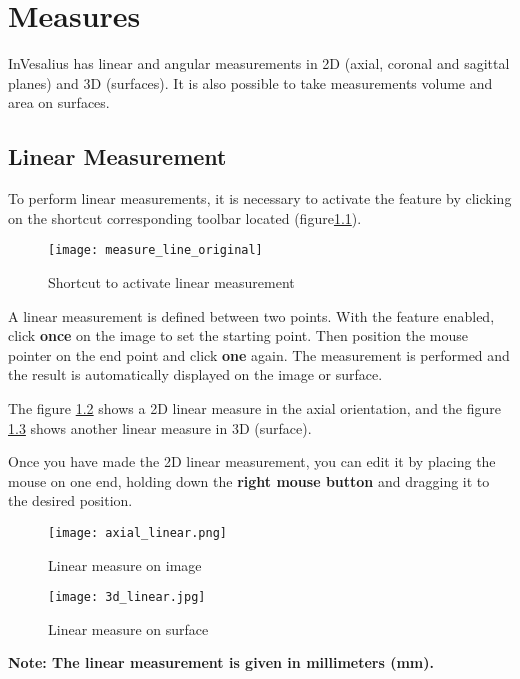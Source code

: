 \chapter{Measures}

InVesalius has linear and angular measurements in 2D (axial, coronal and sagittal planes) and 3D (surfaces). It is also possible to take measurements volume and area on surfaces.

\section{Linear Measurement}

To perform linear measurements, it is necessary to activate the feature by clicking on the shortcut corresponding toolbar located (figure\ref{fig:measure_line_original}).

\begin{figure}[!htb]
\centering
\texttt{[image: measure\_line\_original]}
\caption{Shortcut to activate linear measurement}
\label{fig:measure_line_original}
\end{figure}

A linear measurement is defined between two points. With the feature enabled, click \textbf{once} on the image to set the starting point. Then position the mouse pointer on the end point and click \textbf{one} again. The measurement is performed and the result is automatically displayed on the image or surface.

The figure \ref{fig:axial_linear} shows a 2D linear measure in the axial orientation, and the figure \ref{fig:3d_linear} shows another linear measure in 3D (surface).

Once you have made the 2D linear measurement, you can edit it by placing the mouse on one end, holding down the \textbf{right mouse button} and dragging it to the desired position.

\begin{figure}[!htb]
\centering
\texttt{[image: axial\_linear.png]}
\caption{Linear measure on image}
\label{fig:axial_linear}
\end{figure}

\begin{figure}[!htb]
\centering
\texttt{[image: 3d\_linear.jpg]}
\caption{Linear measure on surface}
\label{fig:3d_linear}
\end{figure}

\textbf{Note: The linear measurement is given in millimeters (mm).}

